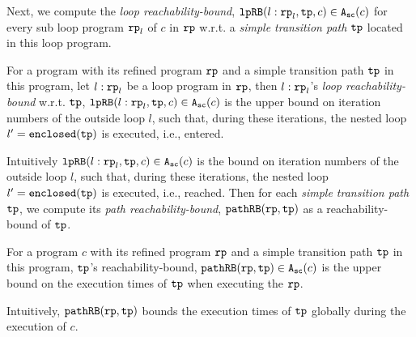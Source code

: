 Next, we compute the \emph{loop reachability-bound},
$\mathtt{lpRB}(l: \mathtt{rp}_l, \mathtt{tp}, c) \in {\ensuremath{\mathtt{A_{sc}}}}(c)$ for every sub loop program $\mathtt{rp}_l$ of $c$ in $\mathtt{rp}$ w.r.t. a \emph{simple transition path} $\mathtt{tp}$ located in this loop program.
\begin{defn}
For a program with its refined program $\mathtt{rp}$ and a simple transition path $\mathtt{tp}$ in this program, 
let $l: \mathtt{rp}_l$ be a loop program in $\mathtt{rp}$,
then $l: \mathtt{rp}_l$'s \emph{loop reachability-bound} w.r.t. $\mathtt{tp}$,  $\mathtt{lpRB}(l: \mathtt{rp}_l, \mathtt{tp}, c) \in {\ensuremath{\mathtt{A_{sc}}}}(c)$
is the upper bound on iteration numbers of the outside loop $l$,
such that,
during these iterations, the nested loop $l' = \mathtt{enclosed(\mathtt{tp})}$ is executed, i.e., entered.
\end{defn}
Intuitively $\mathtt{lpRB}(l: \mathtt{rp}_l, \mathtt{tp}, c) \in {\ensuremath{\mathtt{A_{sc}}}}(c)$
is the bound on iteration numbers of the outside loop $l$,
such that,
during these iterations, the nested loop $l' = \mathtt{enclosed(\mathtt{tp})}$ is executed, i.e., reached.
Then for each \emph{simple transition path} $\mathtt{tp}$, we compute its \emph{path reachability-bound}, $\mathtt{pathRB}(\mathtt{rp}, \mathtt{tp})$ as a reachability-bound of $\mathtt{tp}$.
%
\begin{defn}
For a program $c$ with its refined program $\mathtt{rp}$ and a simple transition path $\mathtt{tp}$ in this program, 
$\mathtt{tp}$'s reachability-bound, $\mathtt{pathRB}(\mathtt{rp}, \mathtt{tp}) \in {\ensuremath{\mathtt{A_{sc}}}}(c)$ is the upper bound on the
execution times of $\mathtt{tp}$ when executing the $\mathtt{rp}$.
\end{defn}
Intuitively, $\mathtt{pathRB}(\mathtt{rp}, \mathtt{tp})$ bounds the execution times of $\mathtt{tp}$ globally during the execution of $c$.

